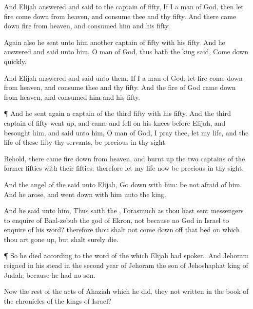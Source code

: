 {And
Elijah
answered and
said to the
captain of
fifty, If I
{} a
man of
God, then let
fire come
down from
heaven, and
consume thee and thy
fifty. And there came
down
fire from
heaven, and
consumed him and his
fifty.

Again also he
sent unto him
another
captain of
fifty with his
fifty. And he
answered and
said unto him, O
man of
God, thus hath the
king
said, Come
down
quickly.

And
Elijah
answered and
said unto them, If I
{} a
man of
God, let
fire come
down from
heaven, and
consume thee and thy
fifty. And the
fire of
God came
down from
heaven, and
consumed him and his
fifty.


\par }{\PP {}¶ And he
sent
again a
captain of the
third
fifty with his
fifty. And the
third
captain of
fifty went
up, and
came and
fell on his
knees
before
Elijah, and
besought him, and
said unto him, O
man of
God, I pray thee, let my
life, and the
life of these
fifty thy
servants, be
precious in thy
sight.

Behold, there
came
fire
down from
heaven, and burnt
up the
two
captains of the
former
fifties with their
fifties: therefore let my
life now be
precious in thy
sight.

And the
angel of the
{}
said unto
Elijah, Go
down with him: be not
afraid of
him. And he
arose, and went
down with him unto the
king.

And he
said unto him, Thus
saith the
{}, Forasmuch as thou hast
sent
messengers to
enquire of
Baal-zebub the
god of
Ekron,
{} not because
{} no
God in
Israel to
enquire of his
word? therefore thou shalt not come
down off that
bed on which thou art gone
up, but shalt
surely
die.


\par }{\PP {}¶ So he
died according to the
word of the
{} which
Elijah had
spoken. And
Jehoram
reigned in his stead in the
second
year of
Jehoram the
son of
Jehoshaphat
king of
Judah; because he had no
son.

Now the
rest of the
acts of
Ahaziah which he
did,
{} they not
written in the
book of the
chronicles of the
kings of
Israel?




\par }
